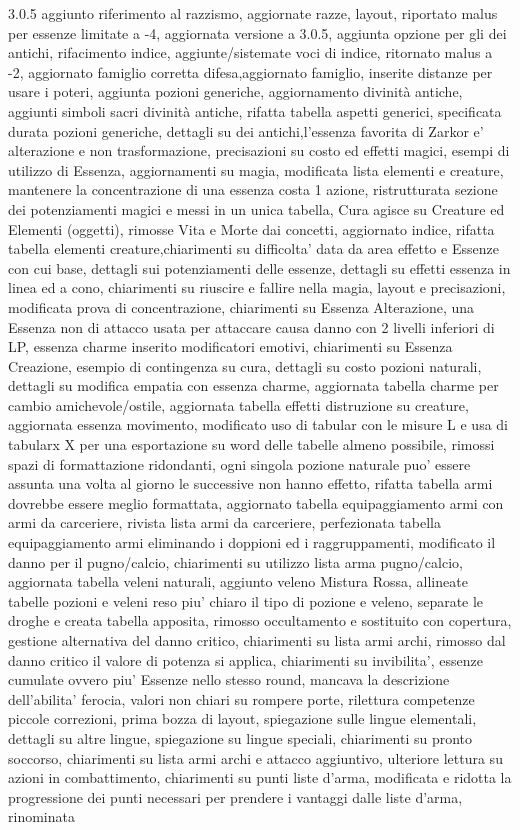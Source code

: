 \documentclass[a4paper,11pt,twoside,openany]{book}
\begin{document}
{{    3.0.5 aggiunto riferimento al razzismo, aggiornate razze, layout, riportato malus per essenze limitate a -4, aggiornata versione a 3.0.5, aggiunta opzione per gli dei antichi,  rifacimento indice, aggiunte/sistemate voci di indice, ritornato malus a -2, aggiornato famiglio corretta difesa,aggiornato famiglio, inserite distanze per usare i poteri, aggiunta pozioni generiche, aggiornamento divinità antiche, aggiunti simboli sacri divinità antiche, rifatta tabella aspetti generici, specificata durata pozioni generiche, dettagli su dei antichi,l'essenza favorita di Zarkor e' alterazione e non trasformazione, precisazioni su costo ed effetti magici, esempi di utilizzo di Essenza, aggiornamenti su magia, modificata lista elementi e creature, mantenere la concentrazione di una essenza costa 1 azione, ristrutturata sezione dei potenziamenti magici e messi in un unica tabella, Cura agisce su Creature ed Elementi (oggetti), rimosse Vita e Morte dai concetti, aggiornato indice, rifatta tabella elementi creature,chiarimenti su difficolta' data da area effetto e Essenze con cui base, dettagli sui potenziamenti delle essenze, dettagli su effetti essenza in linea  ed a cono, chiarimenti su riuscire e fallire nella magia, layout e precisazioni, modificata prova di concentrazione, chiarimenti su Essenza Alterazione, una Essenza non di attacco usata per attaccare causa danno con 2 livelli inferiori di LP, essenza charme inserito modificatori emotivi, chiarimenti su Essenza Creazione, esempio di contingenza su cura, dettagli su costo pozioni naturali, dettagli su modifica empatia con essenza charme, aggiornata tabella charme per cambio amichevole/ostile, aggiornata tabella effetti distruzione su creature, aggiornata essenza movimento, modificato uso di tabular con le misure L e usa di tabularx X per una esportazione su word delle tabelle almeno possibile, rimossi spazi di formattazione ridondanti, ogni singola pozione naturale puo' essere assunta una volta al giorno le successive non hanno effetto, rifatta tabella armi dovrebbe essere meglio formattata, aggiornato tabella equipaggiamento armi con armi da carceriere, rivista lista armi da carceriere, perfezionata tabella equipaggiamento armi eliminando i doppioni ed i raggruppamenti, modificato il danno per il pugno/calcio, chiarimenti su utilizzo lista arma pugno/calcio, aggiornata tabella veleni naturali, aggiunto veleno Mistura Rossa, allineate tabelle pozioni e veleni reso piu' chiaro il tipo di pozione e veleno, separate le droghe e creata tabella apposita, rimosso occultamento e sostituito con copertura, gestione alternativa del danno critico, chiarimenti su lista armi archi, rimosso dal danno critico il valore di potenza si applica, chiarimenti su invibilita', essenze cumulate ovvero piu' Essenze nello stesso round, mancava la descrizione dell'abilita' ferocia, valori non chiari su rompere porte, rilettura competenze piccole correzioni, prima bozza di layout, spiegazione sulle lingue elementali, dettagli su altre lingue, spiegazione su lingue speciali, chiarimenti su pronto soccorso, chiarimenti su lista armi archi e attacco aggiuntivo, ulteriore lettura su azioni in combattimento, chiarimenti su punti liste d'arma, modificata e ridotta la progressione dei punti necessari per prendere i vantaggi dalle liste d'arma, rinominata }}
\end{document}
